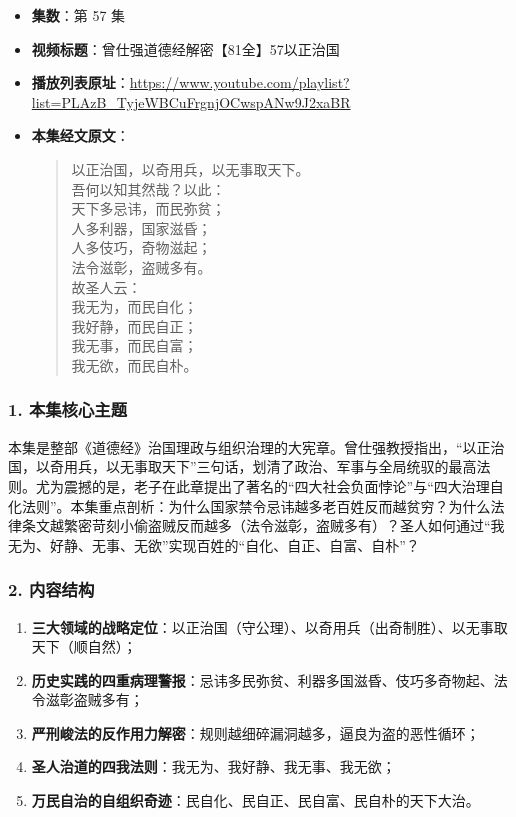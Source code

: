 \begin{itemize}
    \item \textbf{集数}：第 57 集
    \item \textbf{视频标题}：曾仕强道德经解密【81全】57以正治国
    \item \textbf{播放列表原址}：\url{https://www.youtube.com/playlist?list=PLAzB_TyjeWBCuFrgnjOCwspANw9J2xaBR}
    \item \textbf{本集经文原文}：
    \begin{quote}\kaishu
    以正治国，以奇用兵，以无事取天下。\\
    吾何以知其然哉？以此：\\
    天下多忌讳，而民弥贫；\\
    人多利器，国家滋昏；\\
    人多伎巧，奇物滋起；\\
    法令滋彰，盗贼多有。\\
    故圣人云：\\
    我无为，而民自化；\\
    我好静，而民自正；\\
    我无事，而民自富；\\
    我无欲，而民自朴。
    \end{quote}
\end{itemize}

\subsubsection{1. 本集核心主题}
本集是整部《道德经》治国理政与组织治理的大宪章。曾仕强教授指出，“以正治国，以奇用兵，以无事取天下”三句话，划清了政治、军事与全局统驭的最高法则。尤为震撼的是，老子在此章提出了著名的“四大社会负面悖论”与“四大治理自化法则”。本集重点剖析：为什么国家禁令忌讳越多老百姓反而越贫穷？为什么法律条文越繁密苛刻小偷盗贼反而越多（法令滋彰，盗贼多有）？圣人如何通过“我无为、好静、无事、无欲”实现百姓的“自化、自正、自富、自朴”？

\subsubsection{2. 内容结构}
\begin{enumerate}
    \item \textbf{三大领域的战略定位}：以正治国（守公理）、以奇用兵（出奇制胜）、以无事取天下（顺自然）；
    \item \textbf{历史实践的四重病理警报}：忌讳多民弥贫、利器多国滋昏、伎巧多奇物起、法令滋彰盗贼多有；
    \item \textbf{严刑峻法的反作用力解密}：规则越细碎漏洞越多，逼良为盗的恶性循环；
    \item \textbf{圣人治道的四我法则}：我无为、我好静、我无事、我无欲；
    \item \textbf{万民自治的自组织奇迹}：民自化、民自正、民自富、民自朴的天下大治。
\end{enumerate}


